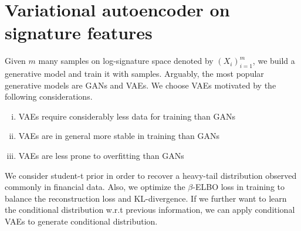 \documentclass[12pt]{report}
\theoremstyle{definition}
\theoremstyle{remark}
\begin{document}
\section{Variational autoencoder on signature features}
Given $m$ many samples on log-signature space denoted by $(X_{i})_{i=1}^{m}$, we build a generative model and train it with samples. Arguably, the most popular generative models are GANs and VAEs. We choose VAEs motivated by the following considerations. 
\begin{enumerate}[(i)]
  \item VAEs require considerably less data for training than GANs 
  \item VAEs are in general more stable in training than GANs
  \item VAEs are less prone to overfitting than GANs
\end{enumerate}
We consider student-t prior in order to recover a heavy-tail distribution observed commonly in financial data. Also, we optimize the $\beta$-ELBO loss in training to balance the reconstruction loss and KL-divergence. If we further want to learn the conditional distribution w.r.t previous information, we can apply conditional VAEs to generate conditional distribution. 
\end{document}
